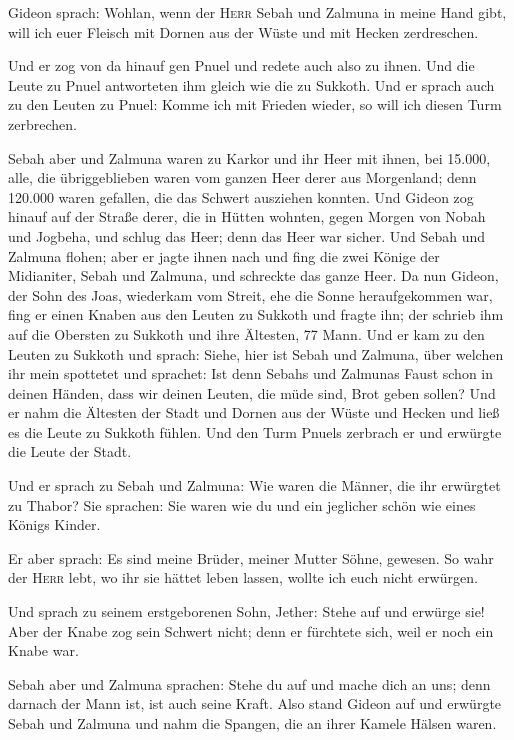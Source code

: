  Gideon sprach: Wohlan, wenn der \textsc{Herr} Sebah und
Zalmuna in meine Hand gibt, will ich euer Fleisch mit Dornen aus der
Wüste und mit Hecken zerdreschen.

 Und er zog von da hinauf gen Pnuel und redete auch also
zu ihnen. Und die Leute zu Pnuel antworteten ihm gleich wie die zu
Sukkoth.  Und er sprach auch zu den Leuten zu Pnuel: Komme
ich mit Frieden wieder, so will ich diesen Turm zerbrechen.

 Sebah aber und Zalmuna waren zu Karkor und ihr Heer mit
ihnen, bei 15.000, alle, die übriggeblieben waren vom ganzen Heer derer
aus Morgenland; denn 120.000 waren gefallen, die das Schwert ausziehen
konnten.  Und Gideon zog hinauf auf der Straße derer, die
in Hütten wohnten, gegen Morgen von Nobah und Jogbeha, und schlug das
Heer; denn das Heer war sicher.  Und Sebah und Zalmuna
flohen; aber er jagte ihnen nach und fing die zwei Könige der
Midianiter, Sebah und Zalmuna, und schreckte das ganze Heer.
 Da nun Gideon, der Sohn des Joas, wiederkam vom Streit,
ehe die Sonne heraufgekommen war,  fing er einen Knaben
aus den Leuten zu Sukkoth und fragte ihn; der schrieb ihm auf die
Obersten zu Sukkoth und ihre Ältesten, 77 Mann.  Und er
kam zu den Leuten zu Sukkoth und sprach: Siehe, hier ist Sebah und
Zalmuna, über welchen ihr mein spottetet und sprachet: Ist denn Sebahs
und Zalmunas Faust schon in deinen Händen, dass wir deinen Leuten, die
müde sind, Brot geben sollen?  Und er nahm die Ältesten
der Stadt und Dornen aus der Wüste und Hecken und ließ es die Leute zu
Sukkoth fühlen.  Und den Turm Pnuels zerbrach er und
erwürgte die Leute der Stadt.

 Und er sprach zu Sebah und Zalmuna: Wie waren die
Männer, die ihr erwürgtet zu Thabor? Sie sprachen: Sie waren wie du und
ein jeglicher schön wie eines Königs Kinder.

 Er aber sprach: Es sind meine Brüder, meiner Mutter
Söhne, gewesen. So wahr der \textsc{Herr} lebt, wo ihr sie hättet leben
lassen, wollte ich euch nicht erwürgen.

 Und sprach zu seinem erstgeborenen Sohn, Jether: Stehe
auf und erwürge sie! Aber der Knabe zog sein Schwert nicht; denn er
fürchtete sich, weil er noch ein Knabe war.

 Sebah aber und Zalmuna sprachen: Stehe du auf und mache
dich an uns; denn darnach der Mann ist, ist auch seine Kraft. Also stand
Gideon auf und erwürgte Sebah und Zalmuna und nahm die Spangen, die an
ihrer Kamele Hälsen waren.

